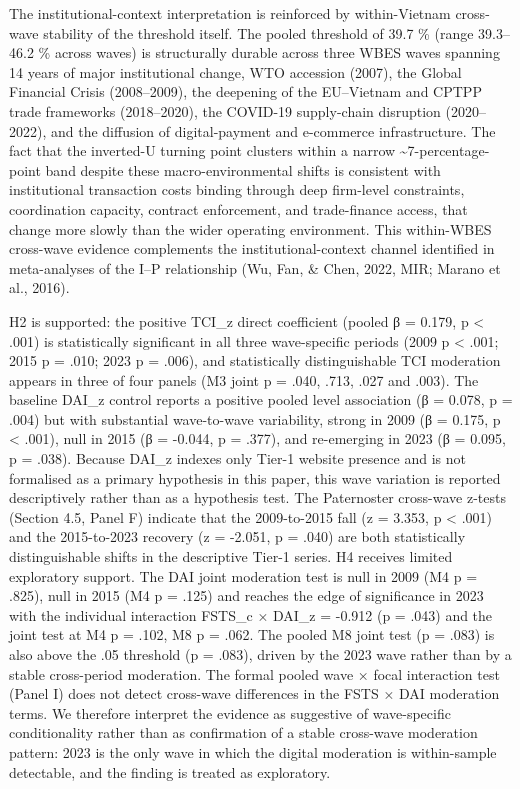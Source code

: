 \documentclass[12pt,a4paper]{article}
\begin{document}
The institutional-context interpretation is reinforced by within-Vietnam
cross-wave stability of the threshold itself. The pooled threshold of
39.7 \% (range 39.3--46.2 \% across waves) is structurally durable
across three WBES waves spanning 14 years of major institutional change,
WTO accession (2007), the Global Financial Crisis (2008--2009), the
deepening of the EU--Vietnam and CPTPP trade frameworks (2018--2020),
the COVID-19 supply-chain disruption (2020--2022), and the diffusion of
digital-payment and e-commerce infrastructure. The fact that the
inverted-U turning point clusters within a narrow
\textasciitilde7-percentage-point band despite these macro-environmental
shifts is consistent with institutional transaction costs binding
through deep firm-level constraints, coordination capacity, contract
enforcement, and trade-finance access, that change more slowly than the
wider operating environment. This within-WBES cross-wave evidence
complements the institutional-context channel identified in
meta-analyses of the I--P relationship (Wu, Fan, \& Chen, 2022, MIR;
Marano et al., 2016).

H2 is supported: the positive TCI\_z direct coefficient (pooled β =
0.179, p \textless{} .001) is statistically significant in all three
wave-specific periods (2009 p \textless{} .001; 2015 p = .010; 2023 p =
.006), and statistically distinguishable TCI moderation appears in three
of four panels (M3 joint p = .040, .713, .027 and .003). The baseline
DAI\_z control reports a positive pooled level association (β = 0.078, p
= .004) but with substantial wave-to-wave variability, strong in 2009 (β
= 0.175, p \textless{} .001), null in 2015 (β = -0.044, p = .377), and
re-emerging in 2023 (β = 0.095, p = .038). Because DAI\_z indexes only
Tier-1 website presence and is not formalised as a primary hypothesis in
this paper, this wave variation is reported descriptively rather than as
a hypothesis test. The Paternoster cross-wave z-tests (Section 4.5,
Panel F) indicate that the 2009-to-2015 fall (z = 3.353, p \textless{}
.001) and the 2015-to-2023 recovery (z = -2.051, p = .040) are both
statistically distinguishable shifts in the descriptive Tier-1 series.
H4 receives limited exploratory support. The DAI joint moderation test
is null in 2009 (M4 p = .825), null in 2015 (M4 p = .125) and reaches
the edge of significance in 2023 with the individual interaction FSTS\_c
× DAI\_z = -0.912 (p = .043) and the joint test at M4 p = .102, M8 p =
.062. The pooled M8 joint test (p = .083) is also above the .05
threshold (p = .083), driven by the 2023 wave rather than by a stable
cross-period moderation. The formal pooled wave × focal interaction test
(Panel I) does not detect cross-wave differences in the FSTS × DAI
moderation terms. We therefore interpret the evidence as suggestive of
wave-specific conditionality rather than as confirmation of a stable
cross-wave moderation pattern: 2023 is the only wave in which the
digital moderation is within-sample detectable, and the finding is
treated as exploratory.
\end{document}
